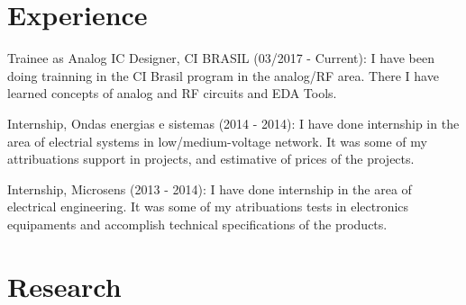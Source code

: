 \documentclass[]{cv-style}          %
\begin{document}
\section{Experience}

\begin{entrylist}


	\entry
	{}
	{Trainee as Analog IC Designer,  CI BRASIL (03/2017 - Current):}
	{\vspace{-0.01cm}}
	{I have been doing trainning in the CI Brasil program in the analog/RF area. There I have learned concepts of analog and RF circuits and EDA Tools. }
	{}

	\entry
	{}
	{Internship, Ondas energias e sistemas (2014 - 2014):}
	{\vspace{-0.01cm}}
	{ I have done internship in the area of electrial systems in low/medium-voltage network. It was some of my attribuations support in projects, and estimative of prices of the projects.    }
	{} %

	\entry
	{}
	{Internship, Microsens (2013 - 2014):}
	{\vspace{-0.01cm}}
	{ I have done internship in the area of electrical engineering. It was some of my atribuations tests in electronics equipaments and accomplish technical specifications of the products.}
\end{entrylist}
{\vspace{-0.05cm}}
\section{Research}
\end{document}
